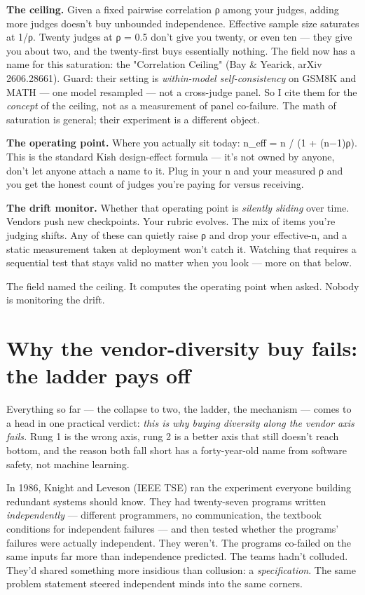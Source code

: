 \documentclass[11pt]{article}
\begin{document}
\textbf{The ceiling.} Given a fixed pairwise correlation ρ among your judges, adding more judges doesn't buy unbounded independence. Effective sample size saturates at 1/ρ. Twenty judges at ρ = 0.5 don't give you twenty, or even ten — they give you about two, and the twenty-first buys essentially nothing. The field now has a name for this saturation: the "Correlation Ceiling" (Bay \& Yearick, arXiv 2606.28661). Guard: their setting is \emph{within-model self-consistency} on GSM8K and MATH — one model resampled — not a cross-judge panel. So I cite them for the \emph{concept} of the ceiling, not as a measurement of panel co-failure. The math of saturation is general; their experiment is a different object.

\textbf{The operating point.} Where you actually sit today: n\_eff = n / (1 + (n−1)ρ). This is the standard Kish design-effect formula — it's not owned by anyone, don't let anyone attach a name to it. Plug in your n and your measured ρ and you get the honest count of judges you're paying for versus receiving.

\textbf{The drift monitor.} Whether that operating point is \emph{silently sliding} over time. Vendors push new checkpoints. Your rubric evolves. The mix of items you're judging shifts. Any of these can quietly raise ρ and drop your effective-n, and a static measurement taken at deployment won't catch it. Watching that requires a sequential test that stays valid no matter when you look — more on that below.

The field named the ceiling. It computes the operating point when asked. Nobody is monitoring the drift.

\section*{Why the vendor-diversity buy fails: the ladder pays off}

Everything so far — the collapse to two, the ladder, the mechanism — comes to a head in one practical verdict: \emph{this is why buying diversity along the vendor axis fails.} Rung 1 is the wrong axis, rung 2 is a better axis that still doesn't reach bottom, and the reason both fall short has a forty-year-old name from software safety, not machine learning.

In 1986, Knight and Leveson (IEEE TSE) ran the experiment everyone building redundant systems should know. They had twenty-seven programs written \emph{independently} — different programmers, no communication, the textbook conditions for independent failures — and then tested whether the programs' failures were actually independent. They weren't. The programs co-failed on the same inputs far more than independence predicted. The teams hadn't colluded. They'd shared something more insidious than collusion: a \emph{specification}. The same problem statement steered independent minds into the same corners.
\end{document}
